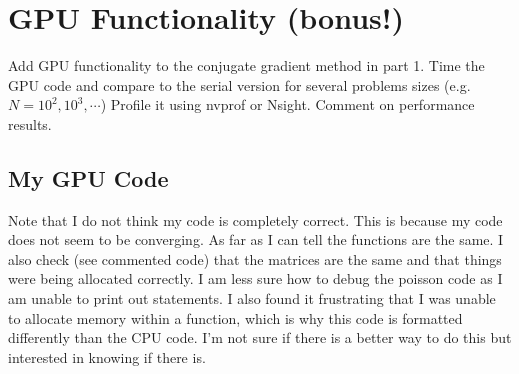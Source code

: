 \documentclass{article}
\begin{document}
\section{GPU Functionality (bonus!)}

Add GPU functionality to the conjugate gradient method in part 1. Time the GPU
code and compare to the serial version for several problems sizes (e.g. $N =
10^2,10^3,\cdots$) Profile it using nvprof or Nsight. Comment on performance
results.

\subsection{My GPU Code}
Note that I do not think my code is completely correct. This is because my code
does not seem to be converging. As far as I can tell the functions are the same.
I also check (see commented code) that the matrices are the same and that things
were being allocated correctly. I am less sure how to debug the poisson code as
I am unable to print out statements. I also found it frustrating that I was
unable to allocate memory within a function, which is why this code is formatted
differently than the CPU code. I'm not sure if there is a better way to do this
but interested in knowing if there is. 
\end{document}
